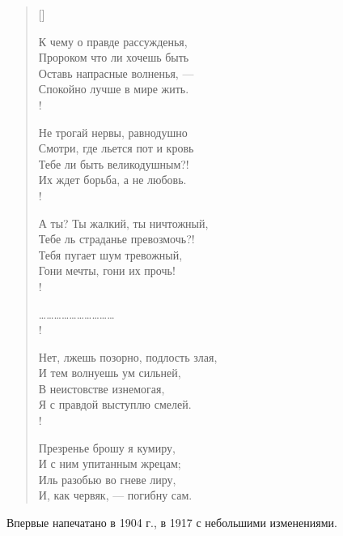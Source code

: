 \newpage
\vspace*{-0.5cm}
 
\settowidth{\versewidth}{А ты? Ты жалкий, ты ничтожный,}
\begin{verse}[\versewidth]
\begin{altverse}
К чему о правде рассужденья,\\ 
Пророком что ли хочешь быть\ldotse\\
Оставь напрасные волненья, ---\\
Спокойно лучше в мире жить.\\!

Не трогай нервы, равнодушно\\
Смотри, где льется пот и кровь\ldotst\\
Тебе ли быть великодушным?!\\
Их ждет борьба, а не любовь.\\!

А ты? Ты жалкий, ты ничтожный,\\
Тебе ль страданье превозмочь?!\\
Тебя пугает шум тревожный,\\
Гони мечты, гони их прочь!\\!
\end{altverse}
\vin\ldots\ldots\ldots\ldots\ldots\ldots\ldots\ldots\ldots\ldots\\!
\begin{altverse}
Нет, лжешь позорно, подлость злая,\\
И тем волнуешь ум сильней,\\
В неистовстве изнемогая,\\
Я с правдой выступлю смелей.\\!

Презренье брошу я кумиру,\\
И с ним упитанным жрецам;\\
Иль разобью во гневе лиру,\\
И, как червяк, --- погибну сам.
\end{altverse}
\end{verse}
Впервые напечатано в 1904 г., в 1917 с небольшими изменениями.

\newpage
\vspace*{0cm}



